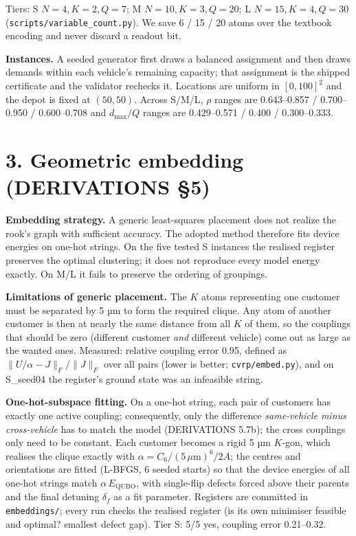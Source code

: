 \documentclass[9pt,a4paper]{extarticle}
\begin{document}
Tiers: S \(N{=}4,K{=}2,Q{=}7\); M \(N{=}10,K{=}3,Q{=}20\); L
\(N{=}15,K{=}4,Q{=}30\) (\texttt{scripts/variable\_count.py}). We save 6
/ 15 / 20 atoms over the textbook encoding and never discard a readout
bit.

\textbf{Instances.} A seeded generator first draws a balanced assignment
and then draws demands within each vehicle's remaining capacity; that
assignment is the shipped certificate and the validator rechecks it.
Locations are uniform in \([0,100]^2\) and the depot is fixed at
\((50,50)\). Across S/M/L, \(\rho\) ranges are 0.643--0.857 /
0.700--0.950 / 0.600--0.708 and \(d_{\max}/Q\) ranges are 0.429--0.571 /
0.400 / 0.300--0.333.

\section{3. Geometric embedding (DERIVATIONS
§5)}\label{geometric-embedding-derivations-5}

\textbf{Embedding strategy.} A generic least-squares placement does not
realize the rook's graph with sufficient accuracy. The adopted method
therefore fits device energies on one-hot strings. On the five tested S
instances the realised register preserves the optimal clustering; it
does not reproduce every model energy exactly. On M/L it fails to
preserve the ordering of groupings.

\textbf{Limitations of generic placement.} The \(K\) atoms representing
one customer must be separated by 5 µm to form the required clique. Any
atom of another customer is then at nearly the same distance from all
\(K\) of them, so the couplings that should be zero (different customer
\emph{and} different vehicle) come out as large as the wanted ones.
Measured: relative coupling error 0.95, defined as
\(\|U/\alpha-J\|_F/\|J\|_F\) over all pairs (lower is better;
\texttt{cvrp/embed.py}), and on S\_seed04 the register's ground state
was an infeasible string.

\textbf{One-hot-subspace fitting.} On a one-hot string, each pair of
customers has exactly one active coupling; consequently, only the
difference \emph{same-vehicle minus cross-vehicle} has to match the
model (DERIVATIONS 5.7b); the cross couplings only need to be constant.
Each customer becomes a rigid 5 µm \(K\)-gon, which realises the clique
exactly with \(\alpha=C_6/(5\,\mu\text{m})^6/2A\); the centres and
orientations are fitted (L-BFGS, 6 seeded starts) so that the device
energies of all one-hot strings match \(\alpha\,E_\text{QUBO}\), with
single-flip defects forced above their parents and the final detuning
\(\delta_f\) as a fit parameter. Registers are committed in
\texttt{embeddings/}; every run checks the realised register (is its own
minimiser feasible and optimal? smallest defect gap). Tier S: 5/5 yes,
coupling error 0.21--0.32.
\end{document}
